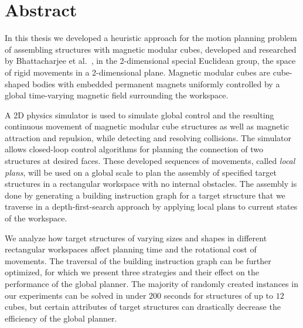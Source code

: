 \chapter*{Abstract}

In this thesis we developed a heuristic approach for the motion planning problem of assembling structures with magnetic modular cubes, developed and researched by Bhattacharjee et al.\ \cite{Bhattacharjee2022}, in the 2-dimensional special Euclidean group, the space of rigid movements in a 2-dimensional plane.
Magnetic modular cubes are cube-shaped bodies with embedded permanent magnets uniformly controlled by a global time-varying magnetic field surrounding the workspace.

A 2D physics simulator is used to simulate global control and the resulting continuous movement of magnetic modular cube structures as well as magnetic attraction and repulsion, while detecting and resolving collisions.
The simulator allows closed-loop control algorithms for planning the connection of two structures at desired faces.
These developed sequences of movements, called \textit{local plans}, will be used on a global scale to plan the assembly of specified target structures in a rectangular workspace with no internal obstacles.
The assembly is done by generating a building instruction graph for a target structure that we traverse in a depth-first-search approach by applying local plans to current states of the workspace.

We analyze how target structures of varying sizes and shapes in different rectangular workspaces affect planning time and the rotational cost of movements.
The traversal of the building instruction graph can be further optimized, for which we present three strategies and their effect on the performance of the global planner.
The majority of randomly created instances in our experiments can be solved in under $200$ seconds for structures of up to $12$ cubes, but certain attributes of target structures can drastically decrease the efficiency of the global planner.